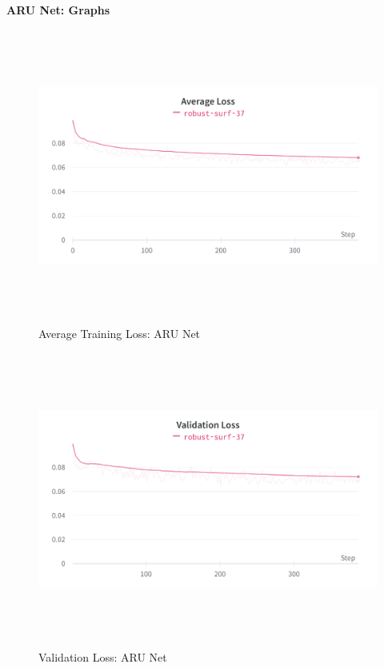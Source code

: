 {\Large  \textbf{ARU Net: Graphs}}

\begin{figure}[H]
	\includegraphics[width=475pt,height=275pt]{Training Loss ARU Net.png}
	\caption{Average Training Loss: ARU Net}
\end{figure}

\begin{figure}[H]
	\includegraphics[width=475pt,height=275pt]{Validation Loss ARU Net.png}
	\caption{Validation Loss: ARU Net}
\end{figure}

